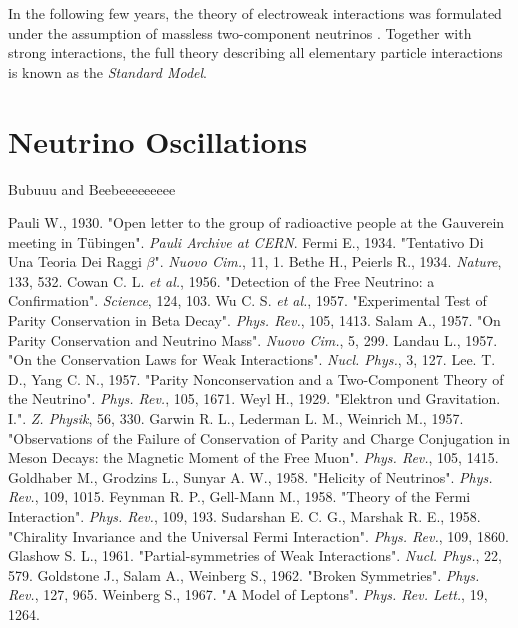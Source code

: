 \documentclass[english]{article}
\begin{document}
    In the following few years, the theory of electroweak interactions was formulated under the assumption of massless two-component neutrinos \cite{glashow1961} \cite{goldstonesalamweinberg1962} \cite{weinberg1967}. Together with strong interactions, the full theory describing all elementary particle interactions is known as the \textit{Standard Model}.

\section{Neutrino Oscillations}

	Bubuuu and Beebeeeeeeeee

\begin{thebibliography}{1}

    Pauli W., 1930. "Open letter to the group of radioactive people at the Gauverein meeting in T\"{u}bingen". \textit{Pauli Archive at CERN}.
    Fermi E., 1934. "Tentativo Di Una Teoria Dei Raggi $\beta$". \textit{Nuovo Cim.}, 11, 1.
    Bethe H., Peierls R., 1934. \textit{Nature}, 133, 532.
    Cowan C. L. \textit{et al.}, 1956. "Detection of the Free Neutrino: a Confirmation". \textit{Science}, 124, 103.
    Wu C. S. \textit{et al.}, 1957. "Experimental Test of Parity Conservation in Beta Decay". \textit{Phys. Rev.}, 105, 1413.
    Salam A., 1957. "On Parity Conservation and Neutrino Mass". \textit{Nuovo Cim.}, 5, 299.
    Landau L., 1957. "On the Conservation Laws for Weak Interactions". \textit{Nucl. Phys.}, 3, 127.
    Lee. T. D., Yang C. N., 1957. "Parity Nonconservation and a Two-Component Theory of the Neutrino". \textit{Phys. Rev.}, 105, 1671.
    Weyl H., 1929. "Elektron und Gravitation. I.". \textit{Z. Physik}, 56, 330.
    Garwin R. L., Lederman L. M., Weinrich M., 1957. "Observations of the Failure of Conservation of Parity and Charge Conjugation in Meson Decays: the Magnetic Moment of the Free Muon". \textit{Phys. Rev.}, 105, 1415.
    Goldhaber M., Grodzins L., Sunyar A. W., 1958. "Helicity of Neutrinos". \textit{Phys. Rev.}, 109, 1015.
    Feynman R. P., Gell-Mann M., 1958. "Theory of the Fermi Interaction". \textit{Phys. Rev.}, 109, 193.
    Sudarshan E. C. G., Marshak R. E., 1958. "Chirality Invariance and the Universal Fermi Interaction". \textit{Phys. Rev.}, 109, 1860.
    Glashow S. L., 1961. "Partial-symmetries of Weak Interactions". \textit{Nucl. Phys.}, 22, 579.
    Goldstone J., Salam A., Weinberg S., 1962. "Broken Symmetries". \textit{Phys. Rev.}, 127, 965.
    Weinberg S., 1967. "A Model of Leptons". \textit{Phys. Rev. Lett.}, 19, 1264.
    
\end{thebibliography}
\end{document}
